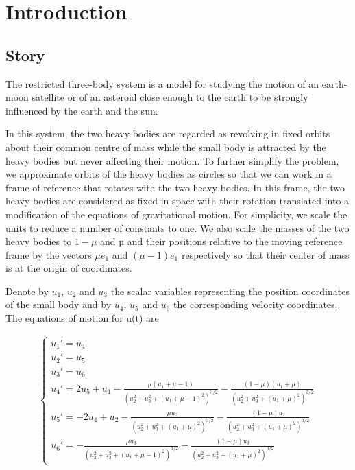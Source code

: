 \chapter{Introduction}
\label{ch:introduction}




\section{Story}

The restricted three-body system is a model for studying
the motion of an earth-moon satellite or of an asteroid close
enough to the earth to be strongly influenced by the earth
and the sun.

In this system, the two heavy bodies are regarded as revolving
 in fixed orbits about their common centre of mass
while the small body is attracted by the heavy bodies but
never affecting their motion. 
To further simplify the problem, we approximate orbits of the 
heavy bodies as circles so
that we can work in a frame of reference that rotates with
the two heavy bodies. In this frame, the two heavy bodies
are considered as fixed in space with their rotation 
translated into a modification of the equations of gravitational
motion. For simplicity, we scale the units to reduce a number 
of constants to one. We also scale the masses of the two
heavy bodies to $1 - \mu$ and µ and their positions relative to
the moving reference frame by the vectors $\mu e_1$ and $(\mu - 1)e_1$
respectively so that their center of mass is at the origin of
coordinates.

Denote by $u_1$, $u_2$ and $u_3$ the scalar variables representing
the position coordinates of the small body and by $u_4$, $u_5$ and
$u_6$ the corresponding velocity coordinates. The equations of
motion for u(t) are

\begin{align*}
    \begin{cases}
        u_1' = u_4\\
        u_2' = u_5\\
        u_3' = u_6\\
        u_4' = 2u_5+u_1-\frac{\mu(u_1+\mu-1)}{(u_2^2+u_3^2+(u_1+\mu-1)^2)^{3/2}}
        -\frac{(1-\mu)(u_1+\mu)}{(u_2^2+u_3^2+(u_1+\mu)^2)^{3/2}}\\
        u_5' = -2u_4 + u_2 - \frac{\mu u_2}{(u_2^2+u_3^2+(u_1+\mu)^2)^{3/2}}
        -\frac{(1-\mu)u_2}{(u_2^2+u_3^2+(u_1+\mu)^2)^{3/2}}\\
        u_6' = -\frac{\mu u_3}{(u_2^2+u_3^2+(u_1+\mu-1)^2)^{3/2}}-\frac{(1-\mu)u_3}{(u_2^2+u_3^2+(u_1+\mu)^2)^{3/2}}
    \end{cases}
\end{align*}

